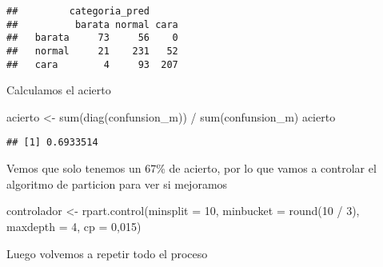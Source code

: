 \documentclass[
]{article}
\newenvironment{Shaded}{\begin{snugshade}}{\end{snugshade}}
\newcommand{\AttributeTok}[1]{\textcolor[rgb]{0.77,0.63,0.00}{#1}}
\newcommand{\DecValTok}[1]{\textcolor[rgb]{0.00,0.00,0.81}{#1}}
\newcommand{\FunctionTok}[1]{\textcolor[rgb]{0.00,0.00,0.00}{#1}}
\newcommand{\NormalTok}[1]{#1}
\newcommand{\OtherTok}[1]{\textcolor[rgb]{0.56,0.35,0.01}{#1}}
\newcommand{\SpecialCharTok}[1]{\textcolor[rgb]{0.00,0.00,0.00}{#1}}
\newcommand{\StringTok}[1]{\textcolor[rgb]{0.31,0.60,0.02}{#1}}
\begin{document}
\begin{Shaded}
\end{Shaded}

\begin{verbatim}
##         categoria_pred
##          barata normal cara
##   barata     73     56    0
##   normal     21    231   52
##   cara        4     93  207
\end{verbatim}

Calculamos el acierto

\begin{Shaded}
\begin{Highlighting}[]
\NormalTok{acierto }\OtherTok{\textless{}{-}} \FunctionTok{sum}\NormalTok{(}\FunctionTok{diag}\NormalTok{(confunsion\_m)) }\SpecialCharTok{/} \FunctionTok{sum}\NormalTok{(confunsion\_m)}
\NormalTok{acierto}
\end{Highlighting}
\end{Shaded}

\begin{verbatim}
## [1] 0.6933514
\end{verbatim}

Vemos que solo tenemos un 67\% de acierto, por lo que vamos a controlar
el algoritmo de particion para ver si mejoramos

\begin{Shaded}
\begin{Highlighting}[]
\NormalTok{controlador }\OtherTok{\textless{}{-}} \FunctionTok{rpart.control}\NormalTok{(}\AttributeTok{minsplit =} \DecValTok{10}\NormalTok{, }\AttributeTok{minbucket =} \FunctionTok{round}\NormalTok{(}\DecValTok{10} \SpecialCharTok{/} \DecValTok{3}\NormalTok{), }\AttributeTok{maxdepth =} \DecValTok{4}\NormalTok{, }\AttributeTok{cp =} \DecValTok{0}\NormalTok{,}\DecValTok{015}\NormalTok{)}
\end{Highlighting}
\end{Shaded}

Luego volvemos a repetir todo el proceso
\end{document}
